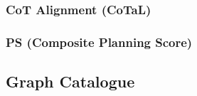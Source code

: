 \clearpage
\subsubsection{CoT Alignment (CoTaL)}


\clearpage
\subsubsection{PS (Composite Planning Score)}


\clearpage
\subsection{Graph Catalogue}
\label{app:graph-catalogue}

